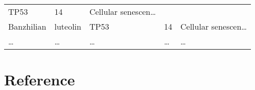 \documentclass[
]{article}
\begin{document}
\begin{longtable}[]{@{}lllll@{}}
\begin{minipage}[t]{0.12\columnwidth}
TP53\strut
\end{minipage} & \begin{minipage}[t]{0.19\columnwidth}\raggedright
14\strut
\end{minipage} & \begin{minipage}[t]{0.21\columnwidth}\raggedright
Cellular senescen\ldots{}\strut
\end{minipage}\tabularnewline
\begin{minipage}[t]{0.17\columnwidth}\raggedright
Banzhilian\strut
\end{minipage} & \begin{minipage}[t]{0.16\columnwidth}\raggedright
luteolin\strut
\end{minipage} & \begin{minipage}[t]{0.12\columnwidth}\raggedright
TP53\strut
\end{minipage} & \begin{minipage}[t]{0.19\columnwidth}\raggedright
14\strut
\end{minipage} & \begin{minipage}[t]{0.21\columnwidth}\raggedright
Cellular senescen\ldots{}\strut
\end{minipage}\tabularnewline
\begin{minipage}[t]{0.17\columnwidth}\raggedright
\ldots{}\strut
\end{minipage} & \begin{minipage}[t]{0.16\columnwidth}\raggedright
\ldots{}\strut
\end{minipage} & \begin{minipage}[t]{0.12\columnwidth}\raggedright
\ldots{}\strut
\end{minipage} & \begin{minipage}[t]{0.19\columnwidth}\raggedright
\ldots{}\strut
\end{minipage} & \begin{minipage}[t]{0.21\columnwidth}\raggedright
\ldots{}\strut
\end{minipage}\tabularnewline
\bottomrule
\end{longtable}

\hypertarget{bibliography}{%
\section*{Reference}\label{bibliography}}
\end{document}

